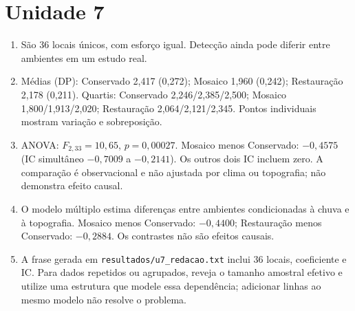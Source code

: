 \section*{Unidade 7}
\begin{enumerate}
\item São 36 locais únicos, com esforço igual. Detecção ainda pode diferir entre ambientes em um estudo real.
\item Médias (DP): Conservado 2,417 (0,272); Mosaico 1,960 (0,242); Restauração 2,178 (0,211). Quartis: Conservado 2,246/2,385/2,500; Mosaico 1,800/1,913/2,020; Restauração 2,064/2,121/2,345. Pontos individuais mostram variação e sobreposição.
\item ANOVA: $F_{2,33}=10{,}65$, $p=0{,}00027$. Mosaico menos Conservado: $-0{,}4575$ (IC simultâneo $-0{,}7009$ a $-0{,}2141$). Os outros dois IC incluem zero. A comparação é observacional e não ajustada por clima ou topografia; não demonstra efeito causal.
\item O modelo múltiplo estima diferenças entre ambientes condicionadas à chuva e à topografia. Mosaico menos Conservado: $-0{,}4400$; Restauração menos Conservado: $-0{,}2884$. Os contrastes não são efeitos causais.
\item A frase gerada em \texttt{resultados/u7\_redacao.txt} inclui 36 locais, coeficiente e IC. Para dados repetidos ou agrupados, reveja o tamanho amostral efetivo e utilize uma estrutura que modele essa dependência; adicionar linhas ao mesmo modelo não resolve o problema.
\end{enumerate}

